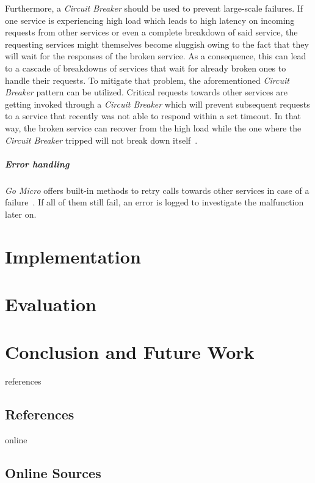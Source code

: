 \documentclass[12pt,a4paper]{report}
\begin{document}
Furthermore, a \textit{Circuit Breaker} should be used to prevent large-scale failures.
If one service is experiencing high load which leads to high latency on incoming
requests from other services or even a complete breakdown of said service,
the requesting services might themselves become sluggish owing to the fact
that they will wait for the responses of the broken service.
As a consequence, this can lead to a cascade of breakdowns of services that wait for
already broken ones to handle their requests. To mitigate that problem,
the aforementioned \textit{Circuit Breaker} pattern can be utilized.
Critical requests towards other services are getting invoked through
a \textit{Circuit Breaker} which will prevent subsequent requests to
a service that recently was not able to respond within a set timeout.
In that way, the broken service can recover from the high load
while the one where the \textit{Circuit Breaker} tripped will not
break down itself~\cite{fowler-circuit-breaker}.

\paragraph{Error handling}
\textit{Go Micro} offers built-in methods to retry calls towards
other services in case of a failure~\cite{go-micro}. If all of them still fail,
an error is logged to investigate the malfunction later on.



\chapter{Implementation} \label{chap:implementation}






\chapter{Evaluation} \label{chap:evaluation}





\chapter{Conclusion and Future Work} \label{chap:conclusion}




\newpage

\listoffigures
\newpage


\begin{btSect}{references}
\section*{References}
\btPrintCited
\end{btSect}
\begin{btSect}{online}
\section*{Online Sources}
\btPrintCited
\end{btSect}
\end{document}
